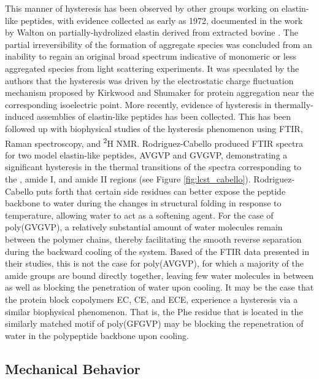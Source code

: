 \begin{refsection}
This manner of hysteresis has been observed by other groups working on
elastin-like peptides, with evidence collected as early as 1972, documented in
the work by Walton on partially-hydrolized elastin derived from extracted bovine
.\cite{Jamieson1972a} The partial irreversibility of
the formation of aggregate species was concluded from an inability to regain an
original broad spectrum indicative of monomeric or less aggregated species from
light scattering experiments. It was speculated by the authors that the
hysteresis was driven by the electrostatic charge fluctuation mechanism proposed
by Kirkwood and Shumaker\cite{Kirkwood1952} for protein aggregation near the
corresponding isoelectric point. More recently, evidence of hysteresis in
thermally-induced assemblies of elastin-like peptides has been
collected.\cite{Osborne2008,Herrero-Vanrell2005} This has been followed up with
biophysical studies of the hysteresis phenomenon using FTIR, Raman spectroscopy,
and \textsuperscript{2}H NMR.\cite{Schmidt2005,Ma2012b} Rodriguez-Cabello
produced FTIR spectra for two model elastin-like peptides, AVGVP and GVGVP,
demonstrating a significant hysteresis in the thermal transitions of the spectra
corresponding to the , amide I, and amide II regions (see Figure
\ref{fig:lcst_cabello}).  Rodriguez-Cabello puts forth that certain side residues
can better expose the peptide backbone to water during the changes in structural
folding in response to temperature, allowing water to act as a softening agent.
For the case of poly(GVGVP), a relatively substantial amount of water molecules
remain between the polymer chains, thereby facilitating the smooth reverse
separation during the backward cooling of the system. Based of the FTIR data
presented in their studies, this is not the case for poly(AVGVP), for which a
majority of the amide groups are bound directly together, leaving few water
molecules in between as well as blocking the penetration of water upon cooling.
It may be the case that the protein block copolymers EC, CE, and ECE, experience
a hysteresis via a similar biophysical phenomenon. That is, the Phe residue that
is located in the similarly matched motif of poly(GFGVP) may be blocking the
repenetration of water in the polypeptide backbone upon cooling. 

\subsection{Mechanical Behavior}


\end{refsection}
